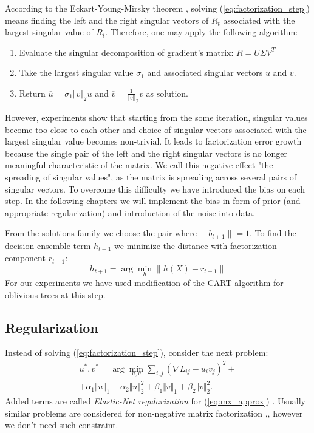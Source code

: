 \documentclass{article}
\begin{document}
According to the Eckart-Young-Mirsky theorem \cite{Eckart1936}, solving (\ref{eq:factorization_step}) means finding the left and the right singular vectors of $R_t$ associated with the largest singular value of $R_t$. Therefore, one may apply the following algorithm: 
\begin{enumerate}
	\item Evaluate the singular decomposition of gradient's matrix: $R = U \Sigma V^T$
	\item Take the largest singular value $\sigma_{1}$ and associated singular vectors $u$ and $v$.
	\item Return $\overline{u}={\sigma_{1}}{\Vert v \Vert}_{2}u$ and $\overline{v}=\frac{1}{\Vert v \Vert}_{2}v$ as solution.
\end{enumerate}
However, experiments show that starting from the some iteration, singular values become too close to each other and choice of singular vectors associated with the largest singular value becomes non-trivial. It leads to factorization error growth because the single pair of the left and the right singular vectors is no longer meaningful characteristic of the matrix. We call this negative effect "the spreading of singular values", as the matrix is spreading across several pairs of singular vectors. To overcome this difficulty we have introduced the bias on each step. In the following chapters we will implement the bias in form of prior (and appropriate regularization) and introduction of the noise into data.

From the solutions family we choose the pair where $\|b_{t+1}\| = 1$. To find the decision ensemble term $h_{t+1}$ we minimize the distance with factorization component $r_{t+1}$:
\begin{equation}
h_{t+1}	= \arg \min_{h} \|h(X) - r_{t+1}\|
\label{eq:minimization_step}
\end{equation}
For our experiments we have used modification of the CART algorithm for oblivious trees \cite{Gulin_winningthe} at this step.

\subsection{Regularization}
Instead of solving (\ref{eq:factorization_step}), consider the next problem:
\begin{multline}
	u^{*}, v^{*} = \arg\min_{u,v}\sum_{i,j}\left(\nabla L_{ij}-u_{i}v_{j}\right)^{2} + \\
	+\alpha_{1} \Vert u\Vert_{1} + \alpha_{2} \Vert u\Vert_{2}^{2} 
	+\beta_{1}  \Vert v\Vert_{1} + \beta_{2}  \Vert v\Vert_{2}^{2}. \label{eq:def-argmin-elasticnet}
\end{multline}
Added terms are called \emph{Elastic-Net regularization} for (\ref{eq:mx_approx}) \cite{elasticnet05}. Usually similar problems are considered for non-negative matrix factorization \cite{MahNMF},\cite{another-nmf-with-en}, however we don't need such constraint.
\end{document}
